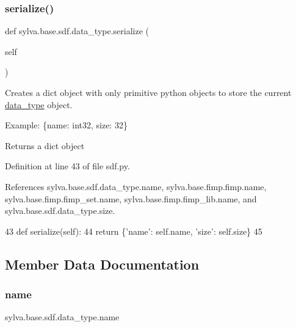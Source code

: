 \subsubsection{\texorpdfstring{serialize()}{serialize()}}
{\footnotesize\ttfamily def sylva.\+base.\+sdf.\+data\+\_\+type.\+serialize (\begin{DoxyParamCaption}\item[{}]{self }\end{DoxyParamCaption})}



Creates a dict object with only primitive python objects to store the current \hyperlink{classsylva_1_1base_1_1sdf_1_1data__type}{data\+\_\+type} object. 

Example\+: \{\textquotesingle{}name\textquotesingle{}\+: \textquotesingle{}int32\textquotesingle{}, \textquotesingle{}size\textquotesingle{}\+: 32\} \begin{DoxyReturn}{Returns}
a dict object 
\end{DoxyReturn}


Definition at line 43 of file sdf.\+py.



References sylva.\+base.\+sdf.\+data\+\_\+type.\+name, sylva.\+base.\+fimp.\+fimp.\+name, sylva.\+base.\+fimp.\+fimp\+\_\+set.\+name, sylva.\+base.\+fimp.\+fimp\+\_\+lib.\+name, and sylva.\+base.\+sdf.\+data\+\_\+type.\+size.


\begin{DoxyCode}
43         \textcolor{keyword}{def }serialize(self):
44             \textcolor{keywordflow}{return} \{\textcolor{stringliteral}{'name'}: self.name, \textcolor{stringliteral}{'size'}: self.size\}
45 
\end{DoxyCode}


\subsection{Member Data Documentation}
\mbox{\label{classsylva_1_1base_1_1sdf_1_1data__type_a5bb984de0211b07ac2a1a882ff7b1744}} 
\subsubsection{\texorpdfstring{name}{name}}
{\footnotesize\ttfamily sylva.\+base.\+sdf.\+data\+\_\+type.\+name}



